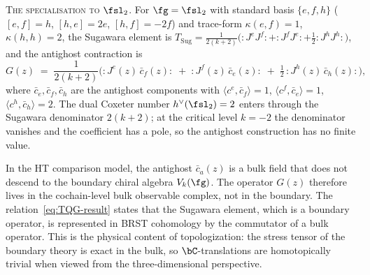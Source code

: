 \begin{construction}
\textsc{The specialisation to $\fsl_2$.}
For $\fg = \fsl_2$ with standard basis
$\{e, f, h\}$ ($[e,f] = h$, $[h,e] = 2e$, $[h,f] = -2f$)
and trace-form
$\kappa(e,f) = 1$, $\kappa(h,h) = 2$, the Sugawara
element is
$T_{\mathrm{Sug}} = \frac{1}{2(k+2)}\bigl(
{:}J^e J^f{:} + {:}J^f J^e{:} + \tfrac{1}{2}{:}J^h J^h{:}\bigr)$,
and the antighost contraction is
\[
G(z) \;=\; \frac{1}{2(k+2)}\bigl(
{:}J^e(z)\,\bar c_f(z){:}
\;+\; {:}J^f(z)\,\bar c_e(z){:}
\;+\; \tfrac{1}{2}\,{:}J^h(z)\,\bar c_h(z){:}
\bigr),
\]
where $\bar c_e, \bar c_f, \bar c_h$ are the antighost components
with $\langle c^e, \bar c_f\rangle = 1$,
$\langle c^f, \bar c_e\rangle = 1$,
$\langle c^h, \bar c_h\rangle = 2$.
The dual Coxeter number $h^\vee(\fsl_2) = 2$ enters through the
Sugawara denominator $2(k+2)$; at the critical level $k = -2$ the
denominator vanishes and the coefficient has a pole, so the
antighost construction has no finite value.
\end{construction}

\begin{remark}
\label{rem:antighost-boundary}%
%
In the HT comparison model, the antighost $\bar c_a(z)$ is a bulk
field that does not descend to the boundary chiral algebra
$V_k(\fg)$.  The operator $G(z)$ therefore lives in the cochain-level
bulk observable complex, not in the boundary. The
relation~\eqref{eq:TQG-result} states that the Sugawara
element, which is a boundary operator, is represented in BRST
cohomology by the commutator of a bulk operator. This is the
physical content of topologization: the
stress tensor of the boundary theory is exact in the bulk, so
$\bC$-translations are homotopically trivial when viewed from the
three-dimensional perspective.
\end{remark}

